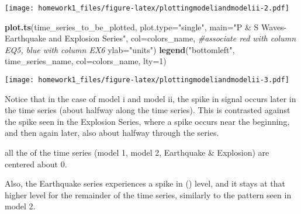 \documentclass[]{article}
\newenvironment{Shaded}{\begin{snugshade}}{\end{snugshade}}
\newcommand{\CommentTok}[1]{\textcolor[rgb]{0.56,0.35,0.01}{\textit{#1}}}
\newcommand{\DataTypeTok}[1]{\textcolor[rgb]{0.13,0.29,0.53}{#1}}
\newcommand{\DecValTok}[1]{\textcolor[rgb]{0.00,0.00,0.81}{#1}}
\newcommand{\KeywordTok}[1]{\textcolor[rgb]{0.13,0.29,0.53}{\textbf{#1}}}
\newcommand{\NormalTok}[1]{#1}
\newcommand{\StringTok}[1]{\textcolor[rgb]{0.31,0.60,0.02}{#1}}
\begin{document}
\texttt{[image: homework1\_files/figure-latex/plottingmodeliandmodelii-2.pdf]}

\begin{Shaded}
\begin{Highlighting}[]
\KeywordTok{plot.ts}\NormalTok{(time_series_to_be_plotted,}
        \DataTypeTok{plot.type=}\StringTok{"single"}\NormalTok{,}
        \DataTypeTok{main=}\StringTok{"P & S Waves- Earthquake and Explosion Series"}\NormalTok{,}
        \DataTypeTok{col=}\NormalTok{colors_name, }\CommentTok{#associate red with column EQ5, blue with column EX6}
        \DataTypeTok{ylab=}\StringTok{"units"}\NormalTok{)}
\KeywordTok{legend}\NormalTok{(}\StringTok{"bottomleft"}\NormalTok{,}
\NormalTok{       time_series_name,}
       \DataTypeTok{col=}\NormalTok{colors_name,}
       \DataTypeTok{lty=}\DecValTok{1}\NormalTok{)}
\end{Highlighting}
\end{Shaded}

\texttt{[image: homework1\_files/figure-latex/plottingmodeliandmodelii-3.pdf]}

Notice that in the case of model i and model ii, the spike in signal
occurs later in the time series (about halfway along the time series).
This is contrasted against the spike seen in the Explosion Series, where
a spike occurs near the beginning, and then again later, also about
halfway through the series.

all the of the time series (model 1, model 2, Earthquake \& Explosion)
are centered about 0.

Also, the Earthquake series experiences a spike in () level, and it
stays at that higher level for the remainder of the time series,
similarly to the pattern seen in model 2.
\end{document}
